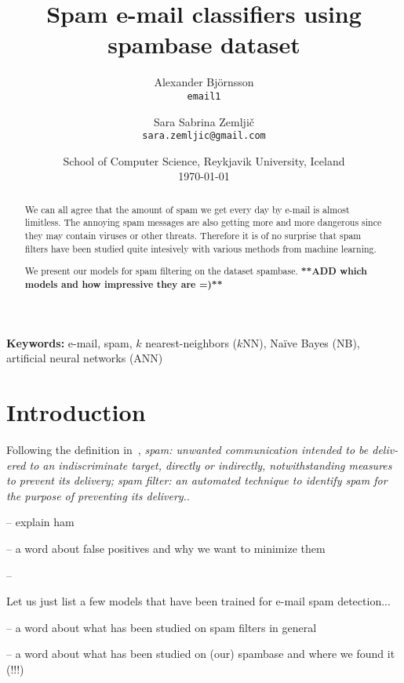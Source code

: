 \documentclass[11pt,a4paper]{article}
\begin{document}
\title{Spam e-mail classifiers using spambase dataset}

\author{
	Alexander Bj\"ornsson\\
	{\tt email1}
\and
	Sara Sabrina Zemlji\v c \\
	{\tt sara.zemljic@gmail.com}
}

\date{{\small School of Computer Science, Reykjavik University, Iceland}\\
\medskip
{\small \today}}
\maketitle

\begin{abstract}
We can all agree that the amount of spam we get every day by e-mail is almost limitless. The annoying spam messages are also getting more and more dangerous since they may contain viruses or other threats. Therefore it is of no surprise that spam filters have been studied quite intesively with various methods from machine learning.

We present our models for spam filtering on the dataset spambase. \textbf{**ADD which models and how impressive they are =)**}
\end{abstract}

\textbf{Keywords:} e-mail, spam, $k$ nearest-neighbors ($k$NN), Na\"ive Bayes (NB), artificial neural networks (ANN)

\section{Introduction}

Following the definition in~\cite[p.2]{Cormack-2006}, \textit{{\em spam}: unwanted communication intended to be deliv- ered to an indiscriminate target, directly or indirectly, notwithstanding measures to prevent its delivery; {\em spam filter}: an automated technique to identify spam for the purpose of preventing its delivery.}.

-- explain ham

-- a word about false positives and why we want to minimize them

--


Let us just list a few models that have been trained for e-mail spam detection...

-- a word about what has been studied on spam filters in general

-- a word about what has been studied on (our) spambase and where we found it (!!!)
\end{document}
